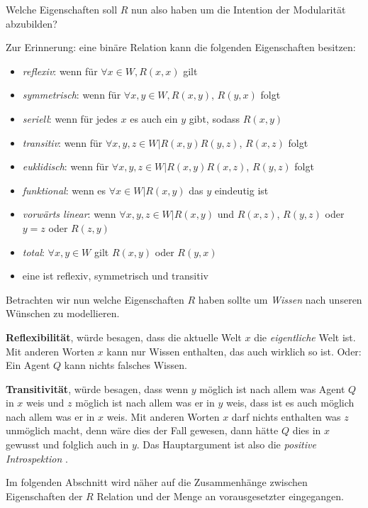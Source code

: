 Welche Eigenschaften soll $R$ nun also haben um die Intention der Modularität abzubilden?

Zur Erinnerung: eine binäre Relation kann die folgenden Eigenschaften besitzen:
\begin{itemize}
	\item \emph{reflexiv}: wenn für $\forall x \in W, R(x,x)$ gilt
	\item \emph{symmetrisch}: wenn für $\forall x,y \in W, R(x,y)$, $R(y,x)$ folgt
	\item \emph{seriell}: wenn für jedes $x$ es auch ein $y$ gibt, sodass $R(x,y)$
	\item \emph{transitiv}: wenn für $\forall x,y,z \in W | R(x,y) R(y,z)$, $R(x,z)$ folgt
	\item \emph{euklidisch}: wenn für $\forall x,y,z \in W | R(x,y) R(x,z)$, $R(y,z)$ folgt
	\item \emph{funktional}: wenn es $\forall x \in W | R(x,y)$ das $y$ eindeutig ist
	\item \emph{vorwärts linear}: wenn $\forall x,y,z \in W | R(x,y)$ und $R(x,z)$, $R(y,z)$ oder $y=z$ oder $R(z,y)$
	\item \emph{total}: $\forall x,y \in W$ gilt $R(x,y)$ oder $R(y,x)$
	\item eine \emph{\EQRef} ist reflexiv, symmetrisch und transitiv
\end{itemize}

Betrachten wir nun welche Eigenschaften $R$ haben sollte um \emph{Wissen} nach unseren Wünschen zu modellieren.

\textbf{Reflexibilität}, würde besagen, dass die aktuelle Welt $x$ die \emph{eigentliche} Welt ist.
Mit anderen Worten $x$ kann nur Wissen enthalten, das auch wirklich so ist.
Oder: Ein Agent $Q$ kann nichts falsches Wissen.

\textbf{Transitivität}, würde besagen, dass wenn $y$ möglich ist nach allem was Agent $Q$ in $x$ weis und $z$ möglich ist nach allem was er in $y$ weis, dass ist es auch möglich nach allem was er in $x$ weis.
Mit anderen Worten $x$ darf nichts enthalten was $z$ unmöglich macht, denn wäre dies der Fall gewesen, dann hätte $Q$ dies in $x$ gewusst und folglich auch in $y$.
Das Hauptargument ist also die \emph{positive Introspektion} \vierFormel {}.

Im folgenden Abschnitt wird näher auf die Zusammenhänge zwischen Eigenschaften der $R$ Relation und der Menge an vorausgesetzter \formelSchemata eingegangen.







